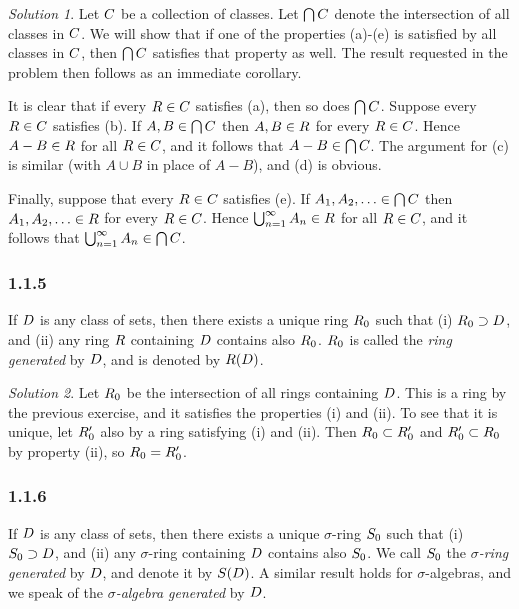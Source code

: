 \documentclass{report}
\let\sc\relax
\newcommand{\sc}[1]{\mathscr{#1}}
\theoremstyle{remark}
\newtheorem*{solution}{Solution}
\begin{document}
\begin{solution}
  Let $\sc C$ be a collection of classes. Let $\bigcap \sc C$ denote the intersection of all classes in $\sc C$. We will show that if one of the properties (a)-(e) is satisfied by all classes in $\sc C$, then $\bigcap \sc C$ satisfies that property as well. The result requested in the problem then follows as an immediate corollary.

  It is clear that if every $\sc R \in \sc C$ satisfies (a), then so does $\bigcap \sc C$. Suppose every $\sc R \in \sc C$ satisfies (b). If $A,B \in \bigcap \sc C$ then $A,B \in \sc R$ for every $\sc R \in \sc C$. Hence $A - B \in \sc R$ for all $\sc R \in \sc C$, and it follows that $A - B \in \bigcap \sc C$. The argument for (c) is similar (with $A \cup B$ in place of $A - B$), and (d) is obvious.

  Finally, suppose that every $\sc R \in \sc C$ satisfies (e). If $A_1, A_2, \dotsc \in \bigcap \sc C$ then $A_1, A_2, \dotsc \in \sc R$ for every $\sc R \in \sc C$. Hence $\bigcup_{n=1}^\infty A_n \in \sc R$ for all $\sc R \in \sc C$, and it follows that $\bigcup_{n=1}^\infty A_n \in \bigcap \sc C$.
\end{solution}

\subsubsection*{1.1.5}
If $\sc D$ is any class of sets, then there exists a unique ring $\sc R_0$ such that (i) $\sc R_0 \supset \sc D$, and (ii) any ring $\sc R$ containing $\sc D$ contains also $\sc R_0$. $\sc R_0$ is called the \emph{ring generated} by $\sc D$, and is denoted by $\sc R(\sc D)$.

\begin{solution}
  Let $\sc R_0$ be the intersection of all rings containing $\sc D$. This is a ring by the previous exercise, and it satisfies the properties (i) and (ii). To see that it is unique, let $\sc R_0'$ also by a ring satisfying (i) and (ii). Then $\sc R_0 \subset \sc R_0'$ and $\sc R_0' \subset \sc R_0$ by property (ii), so $\sc R_0 = \sc R_0'$.
\end{solution}

\subsubsection*{1.1.6}
If $\sc D$ is any class of sets, then there exists a unique $\sigma$-ring $\sc S_0$ such that (i) $\sc S_0 \supset \sc D$, and (ii) any $\sigma$-ring containing $\sc D$ contains also $\sc S_0$. We call $\sc S_0$ the \emph{$\sigma$-ring generated} by $\sc D$, and denote it by $\sc S(\sc D)$. A similar result holds for $\sigma$-algebras, and we speak of the \emph{$\sigma$-algebra generated} by $\sc D$.
\end{document}
